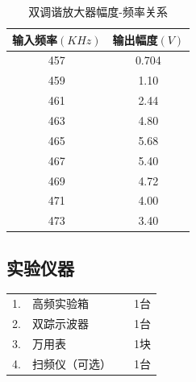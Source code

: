 \documentclass[12pt]{article}%
\numberwithin{equation}{section}
\begin{document}
\begin{table}[htbp]
\centering
\caption{双调谐放大器幅度-频率关系}
\label{tab:bg}
\begin{tabular}{|c|c|}
\hline
输入频率$(KHz)$ & 输出幅度$(V)$ \\ \hline
457         & 0.704     \\ \hline
459         & 1.10      \\ \hline
461         & 2.44      \\ \hline
463         & 4.80      \\ \hline
465         & 5.68      \\ \hline
467         & 5.40      \\ \hline
469         & 4.72      \\ \hline
471         & 4.00      \\ \hline
473         & 3.40      \\ \hline
\end{tabular}
\end{table}

\subsection{实验仪器}
\begin{tabular}{clcc}
1.&高频实验箱&&         1台 \\2.&双踪示波器& &    1台\\3.&  万用表&&             1块\\ 4.&扫频仪（可选）&&       1台\\
\end{tabular}
\end{document}
